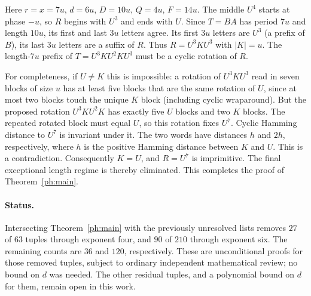 Here $r=x=7u$, $d=6u$, $D=10u$, $Q=4u$, $F=14u$.
The middle $U^4$ starts at phase $-u$, so $R$ begins with $U^3$
and ends with $U$. Since $T=BA$ has period $7u$ and length $10u$,
its first and last $3u$ letters agree. Its first $3u$ letters are
$U^3$ (a prefix of $B$), its last $3u$ letters are a suffix of $R$.
Thus $R=U^3 K U^3$ with $|K|=u$. The length-$7u$ prefix of
$T=U^3 K U^2 K U^3$ must be a cyclic rotation of $R$.

For completeness, if $U\ne K$ this is impossible: a rotation of
$U^3 K U^3$ read in seven blocks of size $u$ has at least five blocks
that are the same rotation of $U$, since at most two blocks touch
the unique $K$ block (including cyclic wraparound). But the proposed
rotation $U^3 K U^2 K$ has exactly five $U$ blocks and two $K$
blocks. The repeated rotated block must equal $U$, so this rotation
fixes $U^7$. Cyclic Hamming distance to $U^7$ is invariant under it.
The two words have distances $h$ and $2h$, respectively, where
$h$ is the positive Hamming distance between $K$ and $U$. This is a
contradiction. Consequently $K=U$, and $R=U^7$ is imprimitive.
The final exceptional length regime is thereby eliminated. This
completes the proof of Theorem~\ref{ph:main}.

\paragraph{Status.}
Intersecting Theorem~\ref{ph:main} with the previously unresolved
lists removes $27$ of $63$ tuples through exponent four, and $90$
of $210$ through exponent six. The remaining counts are $36$ and
$120$, respectively. These are unconditional proofs for those removed
tuples, subject to ordinary independent mathematical review; no bound
on $d$ was needed. The other residual tuples, and a polynomial bound
on $d$ for them, remain open in this work.
